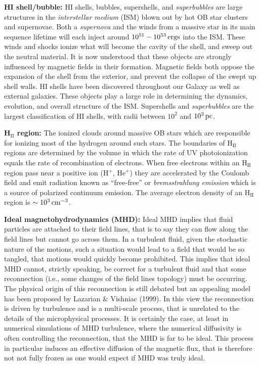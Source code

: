 \documentclass[a4paper,10pt]{article}
\begin{document}
{\noindent}\textbf{HI shell/bubble:} HI shells, bubbles, supershells, and \textit{superbubbles} are large structures in the \textit{interstellar medium} (ISM) blown out by hot OB star clusters and supernovae. Both a \textit{supernova} and the winds from a massive star in its main sequence lifetime will each inject around $10^{51}-10^{53}\,{\rm ergs}$ into the ISM. These winds and shocks ionize what will become the cavity of the shell, and sweep out the neutral material. It is now understood that these objects are strongly influenced by magnetic fields in their formation. Magnetic fields both oppose the expansion of the shell from the exterior, and prevent the collapse of the swept up shell walls. HI shells have been discovered throughout our Galaxy as well as external galaxies. These objects play a large role in determining the dynamics, evolution, and overall structure of the ISM. Supershells and \textit{superbubbles} are the largest classification of HI shells, with radii between $10^2$ and $10^3\,{\rm pc}$.

{\noindent}\textbf{H$_\mathrm{II}$ region:} The ionized clouds around massive OB stars which are responsible for ionizing most of the hydrogen around such stars. The boundaries of H$_\mathrm{II}$ regions are determined by the volume in which the rate of UV photoionization equals the rate of recombination of electrons. When free electrons within an H$_\mathrm{II}$ region pass near a positive ion (H$^+$, He$^+$) they are accelerated by the Coulomb field and emit radiation known as ``free-free'' or \textit{bremsstrahlung emission} which is a source of polarized continuum emission. The average electron density of an H$_\mathrm{II}$ region is $\sim10^3\,{\rm cm^{-3}}$.

{\noindent}\textbf{Ideal magnetohydrodynamics (MHD):} Ideal MHD implies that fluid particles are attached to their field lines, that is to say they can flow along the field lines but cannot go across them. In a turbulent fluid, given the stochastic nature of the motions, such a situation would lead to a field that would be so tangled, that motions would quickly become prohibited. This implies that ideal MHD cannot, strictly speaking, be correct for a turbulent fluid and that some reconnection (i.e., some changes of the field lines topology) must be occurring. The physical origin of this reconnection is still debated but an appealing model has been proposed by Lazarian \& Vishniac (1999). In this view the reconnection is driven by turbulence and is a multi-scale process, that is unrelated to the details of the microphysical processes. It is certainly the case, at least in numerical simulations of MHD turbulence, where the numerical diffusivity is often controlling the reconnection, that the MHD is far to be ideal. This process in particular induces an effective diffusion of the magnetic flux, that is therefore not not fully frozen as one would expect if MHD was truly ideal.
\end{document}
